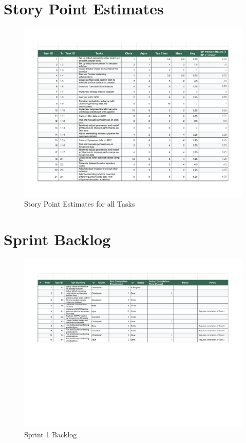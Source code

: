 \documentclass[12pt]{article}
\begin{document}
\section{Story Point Estimates}

\begin{figure}[H]
        \centering
        \includegraphics[width=0.75\linewidth]{images/Sprint Backlog.xlsx-StoryPointEstimates.pdf}
        \caption{Story Point Estimates for all Tasks}
        \label{fig:2}
\end{figure}

\section{Sprint Backlog}

\begin{figure}[H]
        \centering
        \includegraphics[width=0.75\linewidth]{images/Sprint Backlog.xlsx-SprintBacklog1.pdf}
        \caption{Sprint 1 Backlog}
        \label{fig:3}
\end{figure}
\end{document}
